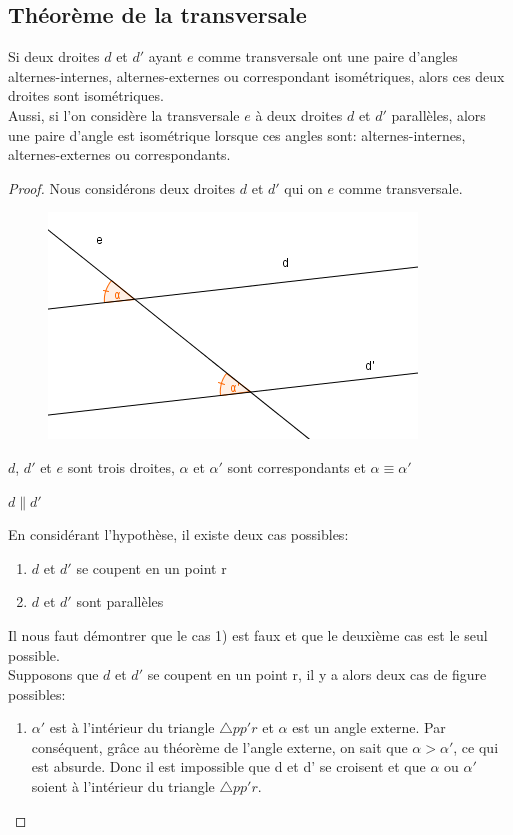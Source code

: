\documentclass[a4paper,12pt]{article}
\begin{document}
\pagebreak
\subsection{Théorème de la transversale}
\begin{theorem}\label{th:transversale}
Si deux droites $d$ et $d'$ ayant $e$ comme transversale ont une paire d'angles alternes-internes, alternes-externes ou correspondant isométriques, alors ces deux droites sont isométriques.\\
Aussi, si l'on considère la transversale $e$ à deux droites $d$ et $d'$ parallèles, alors une paire d'angle est isométrique lorsque ces angles sont: alternes-internes, alternes-externes ou  correspondants.
\end{theorem}
\begin{proof}
Nous considérons deux droites $d$ et $d'$ qui on $e$ comme transversale.
\begin{figure}[H]
    \centering
    \includegraphics[scale=1]{schema/Transversale.PNG}
\end{figure}


\begin{hyp}
     $d$, $d'$ et $e$ sont trois droites,
     $\alpha$ et $\alpha'$ sont correspondants et
     $\alpha \equiv \alpha'$
 \end{hyp}
 \begin{concl}
     $d \parallel d'$
 \end{concl}
 En considérant l'hypothèse, il existe deux cas possibles:
 \begin{enumerate}
     \item $d$ et $d'$ se coupent en un point r
     \item $d$ et $d'$ sont parallèles
 \end{enumerate}
 Il nous faut démontrer que le cas 1) est faux et que le deuxième cas est le seul possible.\\
 Supposons que $d$ et $d'$ se coupent en un point r, il y a alors deux cas de figure possibles:
 \begin{enumerate}[label=\emph{\alph*}.]
  \item $\alpha'$ est à l'intérieur du triangle $\triangle pp'r$ et $\alpha$ est un angle externe. Par conséquent, grâce au théorème de l'angle externe, on sait que $\alpha>\alpha'$, ce qui est absurde. Donc il est impossible que d et d' se croisent et que $\alpha$ ou $\alpha'$ soient à l'intérieur du triangle $\triangle pp'r$.
  

\end{enumerate}
\end{proof}
\end{document}
